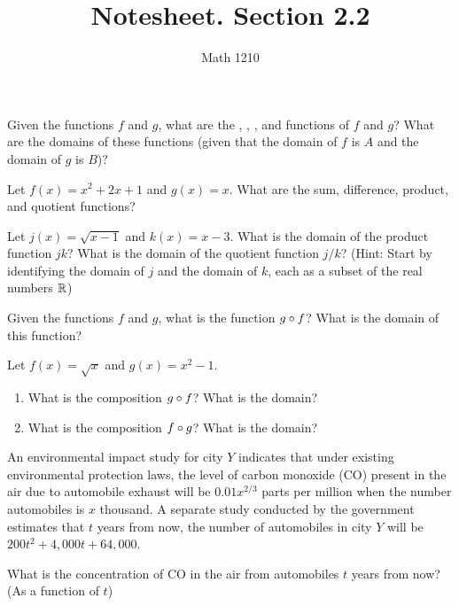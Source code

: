 \documentclass[12pt, a4paper]{article}
\author{Math 1210}
\title{Notesheet. Section 2.2}
\date{}
\begin{document}
\maketitle
\nameline
\begin{defi}
  Given the functions $f$ and $g$, what are the , , , and  functions of $f$ and $g$?  What are the domains of these functions (given that the domain of $f$ is $A$ and the domain of $g$ is $B$)?
\end{defi}
\begin{ex}
  Let $f(x) = x^2 + 2x + 1$ and $g(x) = x$.  What are the sum, difference, product, and quotient functions?
\end{ex}
\begin{ex}
  Let $j(x) = \sqrt{x - 1}$ and $k(x) = x - 3$.  What is the domain of the product function $jk$?  What is the domain of the quotient function $j/k$?  (Hint: Start by identifying the domain of $j$ and the domain of $k$, each as a subset of the real numbers ${\mathbb R}$)
\end{ex}
\vs\vs
\begin{defi}
  Given the functions $f$ and $g$, what is the  function $g \circ f$?  What is the domain of this function?
\end{defi}
\begin{ex}
  Let $f(x) = \sqrt{x}$ and $g(x) = x^2 - 1$.
  \begin{enumerate}
    \item What is the composition $g \circ f$?  What is the domain?
    \item What is the composition $f \circ g$?  What is the domain?
  \end{enumerate}
\end{ex}
\begin{ex}
  An environmental impact study for city $Y$ indicates that under existing environmental protection laws, the level of carbon monoxide (CO) present in the air due to automobile exhaust will be $0.01x^{2/3}$ parts per million when the number automobiles is $x$ thousand.  A separate study conducted by the government estimates that $t$ years from now, the number of automobiles in city $Y$ will be $200t^2 + 4{,}000t + 64{,}000$.

  What is the concentration of CO in the air from automobiles $t$ years from now?  (As a function of $t$)
\end{ex}
\end{document}
